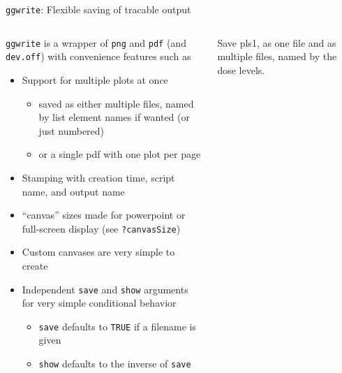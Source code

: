 \documentclass[
  8pt,
  ignorenonframetext,
  aspectratio=169]{beamer}
\providecommand{\tightlist}{%
  \setlength{\itemsep}{0pt}\setlength{\parskip}{0pt}}
\begin{document}
\begin{frame}[fragile]{\texttt{ggwrite}: Flexible saving of tracable
output}
\protect\hypertarget{ggwrite-flexible-saving-of-tracable-output}{}
\begin{columns}[T]
\begin{column}{0.48\textwidth}
\texttt{ggwrite} is a wrapper of \texttt{png} and \texttt{pdf} (and
\texttt{dev.off}) with convenience features such as

\begin{itemize}
\tightlist
\item
  Support for multiple plots at once

  \begin{itemize}
  \tightlist
  \item
    saved as either multiple files, named by list element names if
    wanted (or just numbered)
  \item
    or a single pdf with one plot per page
  \end{itemize}
\item
  Stamping with creation time, script name, and output name
\item
  ``canvas'' sizes made for powerpoint or full-screen display (see
  \texttt{?canvasSize})
\item
  Custom canvases are very simple to create
\item
  Independent \texttt{save} and \texttt{show} arguments for very simple
  conditional behavior

  \begin{itemize}
  \tightlist
  \item
    \texttt{save} defaults to \texttt{TRUE} if a filename is given
  \item
    \texttt{show} defaults to the inverse of \texttt{save}
  \end{itemize}
\end{itemize}
\end{column}

\begin{column}{0.48\textwidth}
Save pls1, as one file and as multiple files, named by the dose levels.
\footnotesize


\end{column}
\end{columns}
\end{frame}
\end{document}
